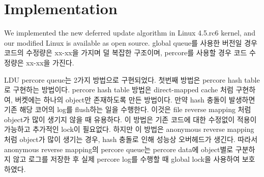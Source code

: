 \section{Implementation}\label{sec:implementation}

We implemented the new deferred update algorithm in Linux 4.5.rc6 kernel, and
our modified Linux is available as open source. 
global queue를 사용한 버전일 경우 코드의 수정량은 xx-xx을 가지며 덜 복잡한 구조이며, 
percore를 사용할 경우 코드 수정량은 xx-xx을 가진다. 


LDU percore queue는 2가지 방법으로 구현되었다. 
첫번째 방법은 percore hash table로 구현하는 방법이다.
percore hash table 방법은 direct-mapped cache 처럼 구현하여, 버켓에는 하나의 object만 존재하도록
만든 방법이다. 
만약 hash 충돌이 발생하면 기존 해당 코어의 log를 flush하는 일을 수행한다.
이것은 file reverse mapping 처럼 object가 많이 생기지 않을 때 유용하다. 
이 방법은 기존 코드에 대한 수정없이 적용이 가능하고 추가적인 lock이 필요없다.
하지만 이 방법은 anonymous reverse mapping 처럼 object가 많이 생기는 경우, hash 충돌로 인해 
성능상 오버헤드가 생긴다. 
따라서 anonymous reverse mapping의 percore queue는 percore data에 object별로
구분하지 않고 로그를 저장한 후 실제 percore log를 수행할 때 global lock을 사용하여 보호하였다. 














